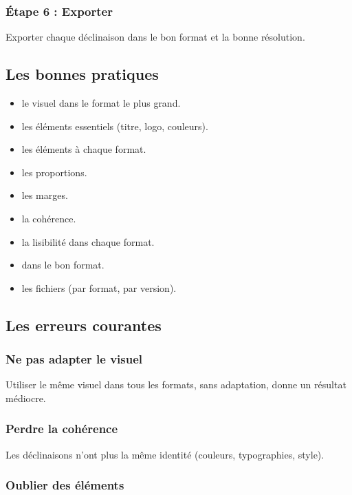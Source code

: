 \subsubsection{Étape 6 : Exporter}

Exporter chaque déclinaison dans le bon format et la bonne résolution.

\subsection{Les bonnes pratiques}

\begin{itemize}
    \item {} le visuel dans le format le plus grand.
    \item {} les éléments essentiels (titre, logo, couleurs).
    \item {} les éléments à chaque format.
    \item {} les proportions.
    \item {} les marges.
    \item {} la cohérence.
    \item {} la lisibilité dans chaque format.
    \item {} dans le bon format.
    \item {} les fichiers (par format, par version).
\end{itemize}

\subsection{Les erreurs courantes}

\subsubsection{Ne pas adapter le visuel}

Utiliser le même visuel dans tous les formats, sans adaptation, donne un résultat médiocre.

\subsubsection{Perdre la cohérence}

Les déclinaisons n'ont plus la même identité (couleurs, typographies, style).

\subsubsection{Oublier des éléments}

